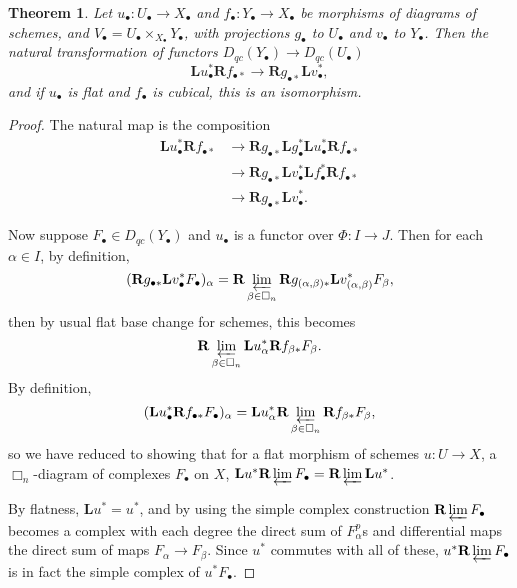 \documentclass{report}
\newtheorem{theorem}{Theorem}[section]
\theoremstyle{definition}
\newcommand{\bL}{\textbf{L}}
\newcommand{\bR}{\textbf{R}}
\begin{document}
\begin{theorem}
	\label{thm:flatbasechange}
	Let $u_\bullet : U_\bullet \rightarrow X_\bullet$ and $f_\bullet : Y_\bullet \rightarrow X_\bullet$ be morphisms of diagrams of schemes, and $V_\bullet = U_\bullet \times_{X_\bullet} Y_\bullet$, with projections $g_\bullet$ to $U_\bullet$ and $v_\bullet$ to $Y_\bullet$.
	Then the natural transformation of functors $D_{qc}(Y_\bullet) \rightarrow D_{qc}(U_\bullet)$
	\[
		\bL u_\bullet^* \bR f_{\bullet *} \rightarrow \bR g_{\bullet *} \bL v_\bullet^*,
	\]
	and if $u_\bullet$ is flat and $f_\bullet$ is cubical, this is an isomorphism.
\end{theorem}
\begin{proof}
	The natural map is the composition
	\begin{align*}
		\bL u_\bullet^* \bR f_{\bullet *} &\rightarrow \bR g_{\bullet *} \bL g_\bullet^* \bL u_\bullet^* \bR f_{\bullet *} \\
		&\rightarrow \bR g_{\bullet *} \bL v_\bullet^* \bL f_\bullet^* \bR f_{\bullet *} \\
		&\rightarrow \bR g_{\bullet *} \bL v_\bullet^*.
	\end{align*}
	
	Now suppose $F_\bullet \in D_{qc}(Y_\bullet)$ and $u_\bullet$ is a functor over $\Phi : I \rightarrow J$.
	Then for each $\alpha \in I$, by definition,
	\[
		(\bR g_{\bullet *} \bL v_\bullet^* F_\bullet)_\alpha = \bR \varprojlim_{\beta \in \Box_n} \bR g_{(\alpha, \beta) *} \bL v_{(\alpha, \beta)}^* F_\beta,
	\]
	then by usual flat base change for schemes, this becomes
	\[
		 \bR \varprojlim_{\beta \in \Box_n} \bL u_{\alpha}^*  \bR f_{\beta *} F_\beta.
	\]
	By definition,
	\[
		(\bL u_\bullet^* \bR f_{\bullet *} F_\bullet)_\alpha = \bL u_\alpha^* \bR \varprojlim_{\beta \in \Box_n} \bR f_{\beta *} F_\beta,
	\]
	so we have reduced to showing that for a flat morphism of schemes $u : U \rightarrow X$, a $\Box_n$-diagram of complexes $F_\bullet$ on $X$, $\bL u^* \bR \varprojlim F_\bullet = \bR \varprojlim \bL u^*$.
	
	By flatness, $\bL u^* = u^*$, and by using the simple complex construction $\bR \varprojlim F_\bullet$ becomes a complex with each degree the direct sum of $F_\alpha^p$s and differential maps the direct sum of maps $F_\alpha \rightarrow F_\beta$.
	Since $u^*$ commutes with all of these, $u^* \bR \varprojlim F_\bullet$ is in fact the simple complex of $u^* F_\bullet$.
\end{proof}
\end{document}
